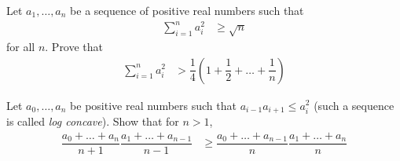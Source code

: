 \documentclass{subfile}
\begin{document}
		\begin{problem}
			Let $a_{1},\ldots,a_{n}$ be a sequence of positive real numbers such that
				\begin{align*}
					\sum_{i=1}^{n}a_{i}^{2}
						& \geq \sqrt{n}
				\end{align*}
			for all $n$. Prove that
				\begin{align*}
					\sum_{i=1}^{n}a_{i}^{2}
						& > \dfrac{1}{4}\left(1+\dfrac{1}{2}+\ldots+\dfrac{1}{n}\right)
				\end{align*}
		\end{problem}

		\begin{problem}
			Let $a_{0},\ldots,a_{n}$ be positive real numbers such that $a_{i-1}a_{i+1}\leq a_{i}^2$ (such a sequence is called \textit{log concave}). Show that for $n>1$,
				\begin{align*}
					\dfrac{a_{0}+\ldots+a_{n}}{n+1}\dfrac{a_{1}+\ldots+a_{n-1}}{n-1}
						& \geq\dfrac{a_{0}+\ldots+a_{n-1}}{n}\dfrac{a_{1}+\ldots+a_{n}}{n}
				\end{align*}
		\end{problem}
\end{document}
